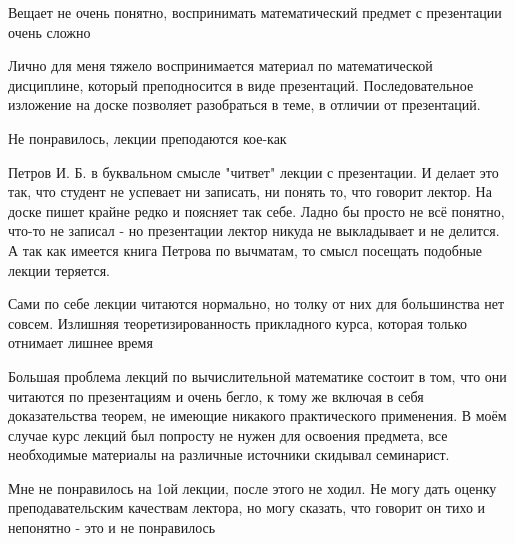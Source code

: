             \begin{commentbox} 
                Вещает не очень понятно, воспринимать математический предмет с презентации очень сложно 
            \end{commentbox} 
        
            \begin{commentbox} 
                Лично для меня тяжело воспринимается материал по математической дисциплине, который преподносится в виде презентаций. Последовательное изложение на доске позволяет разобраться в теме, в отличии от презентаций.  
            \end{commentbox} 
        
            \begin{commentbox} 
                Не понравилось, лекции преподаются кое-как 
            \end{commentbox} 
        
            \begin{commentbox} 
                Петров И. Б. в буквальном смысле "читвет" лекции с презентации. И делает это так, что студент не успевает ни записать, ни понять то, что говорит лектор. На доске пишет крайне редко и поясняет так себе. Ладно бы просто не всё понятно, что-то не записал - но презентации лектор никуда не выкладывает и не делится. А так как имеется книга Петрова по вычматам, то смысл посещать подобные лекции теряется. 
            \end{commentbox} 
        
            \begin{commentbox} 
                Сами по себе лекции читаются нормально, но толку от них для большинства нет совсем. Излишняя теоретизированность прикладного курса, которая только отнимает лишнее время 
            \end{commentbox} 
        
            \begin{commentbox} 
                Большая проблема лекций по вычислительной математике состоит в том, что они читаются по презентациям и очень бегло, к тому же включая в себя доказательства теорем, не имеющие никакого практического применения. В моём случае курс лекций был попросту не нужен для освоения предмета, все необходимые материалы на различные источники скидывал семинарист. 
            \end{commentbox} 
        
            \begin{commentbox} 
                Мне не понравилось на 1ой лекции, после этого не ходил. Не могу дать оценку преподавательским качествам лектора, но могу сказать, что говорит он тихо и непонятно - это и не понравилось 
            \end{commentbox} 
        
